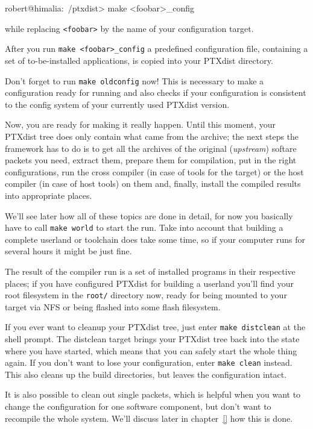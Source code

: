 \begin{code}
robert@himalia:~/ptxdist> make <foobar>_config  
\end{code}

while replacing \texttt{<foobar>} by the name of your configuration target.

\begin{important}
After you run \texttt{make <foobar>\_config} a predefined configuration
file, containing a set of to-be-installed applications, is copied into
your PTXdist directory. 

\vspace{1ex}

Don't forget to run \texttt{make oldconfig} now! This is necessary to
make a configuration ready for running and also checks if your
configuration is consistent to the config system of your currently used
PTXdist version. 
\end{important}

Now, you are ready for making it really happen. Until this moment, your
PTXdist tree does only contain what came from the archive; the next
steps the framework has to do is to get all the archives of the original
(\emph{upstream}) softare packets you need, extract them, prepare them
for compilation, put in the right configurations, run the cross compiler
(in case of tools for the target) or the host compiler (in case of host
tools) on them and, finally, install the compiled results into
appropriate places. 

We'll see later how all of these topics are done in detail, for now you
basically have to call \texttt{make world} to start the run. Take into
account that building a complete userland or toolchain does take some
time, so if your computer runs for several hours it might be just fine.

The result of the compiler run is a set of installed programs in their
respective places; if you have configured PTXdist for building a
userland you'll find your root filesystem in the \texttt{root/}
directory now, ready for being mounted to your target via NFS or being
flashed into some flash filesystem. 

If you ever want to cleanup your PTXdist tree, just enter \texttt{make
distclean} at the shell prompt. The distclean target brings your PTXdist
tree back into the state where you have started, which means that you
can safely start the whole thing again. If you don't want to lose your
configuration, enter \texttt{make clean} instead. This also cleans up
the build directories, but leaves the configuration intact. 

It is also possible to clean out single packets, which is helpful when
you want to change the configuration for one software component, but
don't want to recompile the whole system. We'll discuss later in
chapter~\ref{} how this is done. 

